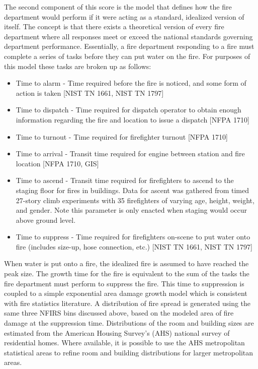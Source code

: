 \documentclass[12pt,oneside]{book}
\begin{document}
The second component of this score is the model that defines how the fire department would perform if it were acting as a standard, idealized version of itself. The concept is that there exists a theoretical version of every fire department where all responses meet or exceed the national standards governing department performance. Essentially, a fire department responding to a fire must complete a series of tasks before they can put water on the fire. For purposes of this model these tasks are broken up as follows:

\begin{itemize}
\item Time to alarm - Time required before the fire is noticed, and some form of action is taken [NIST TN 1661, NIST TN 1797]
\item Time to dispatch - Time required for dispatch operator to obtain enough information regarding the fire and location to issue a dispatch [NFPA 1710]
\item Time to turnout - Time required for firefighter turnout [NFPA 1710]
\item Time to arrival - Transit time required for engine between station and fire location [NFPA 1710, GIS]
\item Time to ascend - Transit time required for firefighters to ascend to the staging floor for fires in buildings. Data for ascent was gathered from timed 27-story climb experiments with 35 firefighters of varying age, height, weight, and gender. Note this parameter is only enacted when staging would occur above ground level.
\item Time to suppress - Time required for firefighters on-scene to put water onto fire (includes size-up, hose connection, etc.) [NIST TN 1661, NIST TN 1797]
\end{itemize}

When water is put onto a fire, the idealized fire is assumed to have reached the peak size. The growth time for the fire is equivalent to the sum of the tasks the fire department must perform to suppress the fire. This time to suppression is coupled to a simple exponential area damage growth model which is consistent with fire statistics literature. A distribution of fire spread is generated using the same three NFIRS bins discussed above, based on the modeled area of fire damage at the suppression time. Distributions of the room and building sizes are estimated from the American Housing Survey's (AHS) national survey of residential homes. Where available, it is possible to use the AHS metropolitan statistical areas to refine room and building distributions for larger metropolitan areas.
\end{document}
